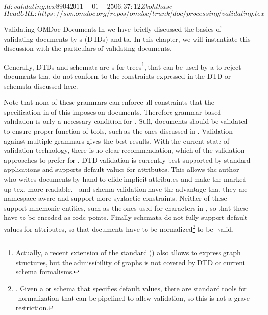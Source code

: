 \svnInfo $Id: validating.tex 8904 2011-01-25 06:37:12Z kohlhase $
\svnKeyword $HeadURL: https://svn.omdoc.org/repos/omdoc/trunk/doc/processing/validating.tex $

\begin{module}[id=validating]
\begin{omgroup}[id=validating]{Validating OMDoc Documents}
In {} we have briefly discussed the basics of validating {\xml}
documents by {s} (DTDs) and {ta}. In
this chapter, we will instantiate this discussion with the particulars of
validating {\omdoc} documents.

Generally, DTDs and schemata are {s} for
trees\footnote{Actually, a recent extension of the {\xml} standard ({\xlink}) also allows
  to express graph structures, but the admissibility of graphs is not covered by DTD or
  current schema formalisms.}, that can be used by a {} to
reject {\xml} documents that do not conform to the constraints expressed in the {\omdoc}
DTD or schemata discussed here.

Note that none of these grammars can enforce all constraints that the {\omdoc}
specification in {} of this {\report} imposes on documents.
Therefore grammar-based validation is only a necessary condition for
. Still, {\omdoc} documents should be validated to
ensure proper function of {\omdoc} tools, such as the ones discussed in
{}.  Validation against multiple grammars gives the
best results. With the current state of validation technology, there is no clear
recommendation, which of the validation approaches to prefer for {\omdoc}. DTD validation
is currently best supported by standard {\xml} applications and supports default values
for attributes. This allows the author who writes {\omdoc} documents by hand to elide
implicit attributes and make the marked-up text more readable.  {\xml}- and {\relaxng}
schema validation have the advantage that they are namespace-aware and support more
syntactic constraints.  Neither of these support mnemonic {\xml} entities, such as the
ones used for {\unicode} characters in {\pmathml}, so that these have to be encoded as
{\unicode} code points. Finally {\relaxng} schemata do not fully support default values
for attributes, so that {\omdoc} documents have to be normalized\footnote{. Given a {} or {\xml} schema that specifies
  default values, there are standard {\xml} tools for {\xml}-normalization that can be
  pipelined to allow {\relaxng} validation, so this is not a grave restriction.} to be
{\relaxng}-valid.


\end{omgroup}
\end{module}
